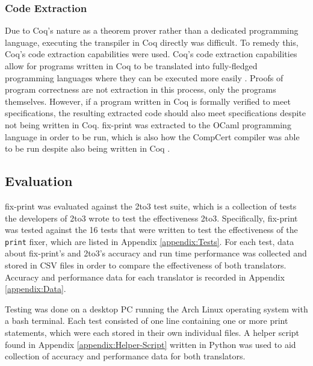 \subsubsection{Code Extraction}
Due to Coq's nature as a theorem prover rather than a dedicated programming language, executing the transpiler in Coq directly was difficult. To remedy this, Coq's code extraction capabilities were used. Coq's code extraction capabilities allow for programs written in Coq to be translated into fully-fledged programming languages where they can be executed more easily \autocite{Filliatre}. Proofs of program correctness are not extraction in this process, only the programs themselves. However, if a program written in Coq is formally verified to meet specifications, the resulting extracted code should also meet specifications despite not being written in Coq. fix-print was extracted to the OCaml programming language in order to be run, which is also how the CompCert compiler was able to be run despite also being written in Coq \autocite{Leroy}.

\subsection{Evaluation}
fix-print was evaluated against the 2to3 test suite, which is a collection of tests the developers of 2to3 wrote to test the effectiveness 2to3. Specifically, fix-print was tested against the 16 tests that were written to test the effectiveness of the \verb|print| fixer, which are listed in Appendix \ref{appendix:Tests}. For each test, data about fix-print's and 2to3's accuracy and run time performance was collected and stored in CSV files in order to compare the effectiveness of both translators. Accuracy and performance data for each translator is recorded in Appendix \ref{appendix:Data}.

Testing was done on a desktop PC running the Arch Linux operating system with a bash terminal. Each test consisted of one line containing one or more print statements, which were each stored in their own individual files. A helper script found in Appendix \ref{appendix:Helper-Script} written in Python was used to aid collection of accuracy and performance data for both translators.

